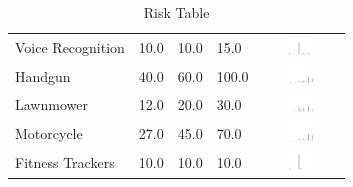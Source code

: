 \begin{table}[t]
\begin{center}
\begin{tabular}{| p{2cm} | p{1cm} | p{1cm} | p{1cm} | c |}
Voice Recognition  & 10.0 & 10.0 & 15.0 & \includegraphics[width = 2cm, height = 0.5cm]{../voicerecognitionrisk} \\ 
Handgun & 40.0 & 60.0 & 100.0 & \includegraphics[width = 2cm, height = 0.5cm]{../HandgunRisk} \\ 
Lawnmower & 12.0 & 20.0 & 30.0 & \includegraphics[width = 2cm, height = 0.5cm]{../LawnmowerRisk} \\ 
Motorcycle & 27.0 & 45.0 & 70.0 & \includegraphics[width = 2cm, height = 0.5cm]{../MotorcycleRisk} \\ 
Fitness Trackers  & 10.0 & 10.0 & 10.0 & \includegraphics[width = 2cm, height = 0.5cm]{../fitnesstrackersrisk} \\ 
\hline
\end{tabular}
\caption{Risk Table}
\label{top10}
\end{center}
\end{table}
